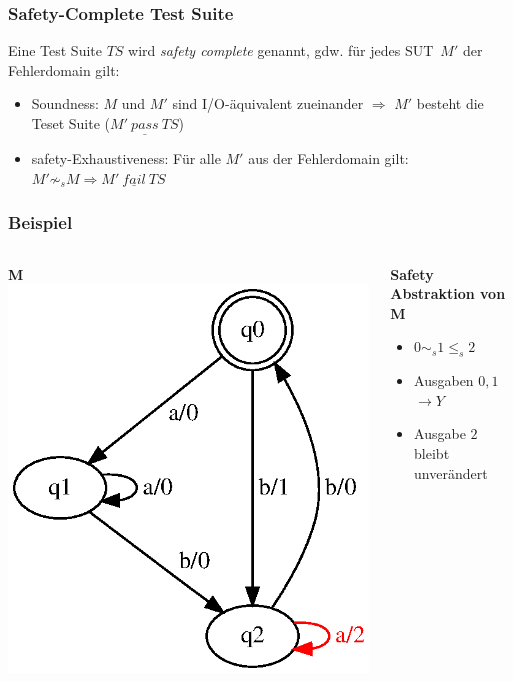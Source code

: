 \begin{frame}
\frametitle{Safety-Complete Test Suite}
Eine Test Suite $TS$ wird \emph{safety complete} genannt, gdw. für jedes SUT~$M'$ der Fehlerdomain gilt:
\begin{itemize}
  \item Soundness: $M$ und $M'$ sind I/O-äquivalent zueinander $\Rightarrow$ $M'$ besteht die Teset Suite ($M'~ \underline{pass}~ TS$)
  \item safety-Exhaustiveness: Für alle $M'$ aus der Fehlerdomain gilt: $M' \not \sim_s M \Rightarrow M'~ \underline{fail}~ TS$
\end{itemize}
\end{frame}

\begin{frame}
\frametitle{Beispiel}
\begin{columns}[T] %

\begin{column}{.50\textwidth}
\textbf{M}
\includegraphics[width=\textwidth]{images/fsm-example01}
\end{column}%

\begin{column}{.50\textwidth}
\textbf{Safety Abstraktion von M}\\
\begin{itemize}
  \item $0 \sim_s 1 \leq_s 2$
  \item Ausgaben $0,1$  $\rightarrow Y$
  \item Ausgabe $2$ bleibt unverändert
\end{itemize}
\end{column}%
\end{columns}
\end{frame}




